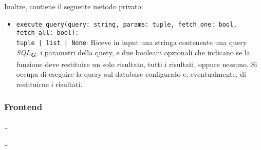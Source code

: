 Inoltre, contiene il seguente metodo privato:
\begin{itemize}
    \item \texttt{execute\_query(query: string, params: tuple, fetch\_one: bool, fetch\_all: bool):\\ tuple | list | None}: Riceve in input una stringa contenente una query \emph{SQL}\textsubscript{\textbf{\textit{G}}}, i parametri della query, e due booleani opzionali che indicano se la funzione deve restituire un solo risultato, tutti i risultati, oppure nessuno. Si occupa di eseguire la query sul database configurato e, eventualmente, di restituirne i risultati.
\end{itemize}

\newpage



\subsubsection{Frontend}
\label{sec:frontend}

\label{sec:component}

\dots

\newpage


\label{sec:service_frontend}

\dots

\newpage
